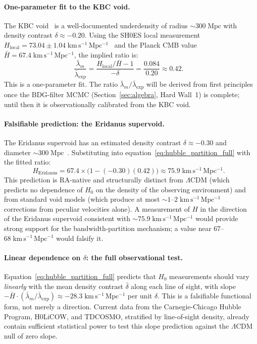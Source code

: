 \documentclass[11pt,a4paper]{article}
\theoremstyle{plain}
\theoremstyle{definition}
\theoremstyle{remark}
\begin{document}
\paragraph{One-parameter fit to the KBC void.}
The KBC void~\citep{Kenworthy2019} is a well-documented underdensity of radius
${\sim}300\;\mathrm{Mpc}$ with density contrast $\delta \approx -0.20$.
Using the SH0ES local measurement $H_{\mathrm{local}} = 73.04 \pm
1.04\;\mathrm{km\,s^{-1}\,Mpc^{-1}}$~\citep{Riess2022} and the Planck CMB
value $\bar H = 67.4\;\mathrm{km\,s^{-1}\,Mpc^{-1}}$, the implied ratio is:
\begin{equation}
  \frac{\bar\lambda_m}{\bar\lambda_{\mathrm{exp}}}
  = \frac{H_{\mathrm{local}}/\bar H - 1}{-\delta}
  = \frac{0.084}{0.20} \approx 0.42.
  \label{eq:lambda_ratio_fit}
\end{equation}
This is a one-parameter fit. The ratio $\bar\lambda_m/\bar\lambda_{\mathrm{exp}}$
will be derived from first principles once the BDG-filter MCMC
(Section~\ref{sec:algebra}, Hard Wall~1) is complete; until then it is
observationally calibrated from the KBC void.

\paragraph{Falsifiable prediction: the Eridanus supervoid.}
The Eridanus supervoid has an estimated density contrast $\delta \approx -0.30$
and diameter ${\sim}300\;\mathrm{Mpc}$~\citep{Naidoo2016}. Substituting into
equation~\eqref{eq:hubble_partition_full} with the fitted ratio:
\begin{equation}
  H_{\mathrm{Eridanus}}
  = 67.4 \times \bigl(1 - (-0.30)(0.42)\bigr)
  \approx 75.9\;\mathrm{km\,s^{-1}\,Mpc^{-1}}.
  \label{eq:eridanus_prediction}
\end{equation}
This prediction is RA-native and structurally distinct from $\Lambda$CDM (which
predicts no dependence of $H_0$ on the density of the observing environment) and
from standard void models (which produce at most ${\sim}1$--$2\;\mathrm{km\,s^{-1}\,Mpc^{-1}}$
corrections from peculiar velocities alone). A measurement of $H$ in the
direction of the Eridanus supervoid consistent with ${\sim}75.9\;\mathrm{km\,s^{-1}\,Mpc^{-1}}$
would provide strong support for the bandwidth-partition mechanism; a value
near $67$--$68\;\mathrm{km\,s^{-1}\,Mpc^{-1}}$ would falsify it.

\paragraph{Linear dependence on $\delta$: the full observational test.}
Equation~\eqref{eq:hubble_partition_full} predicts that $H_0$ measurements
should vary \emph{linearly} with the mean density contrast $\bar\delta$ along
each line of sight, with slope $-\bar H \cdot (\bar\lambda_m/\bar\lambda_{\mathrm{exp}})
\approx -28.3\;\mathrm{km\,s^{-1}\,Mpc^{-1}}$ per unit $\delta$. This is a
falsifiable functional form, not merely a direction. Current data from the
Carnegie-Chicago Hubble Program, H0LiCOW, and TDCOSMO, stratified by
line-of-sight density, already contain sufficient statistical power to test
this slope prediction against the $\Lambda$CDM null of zero slope.
\end{document}

